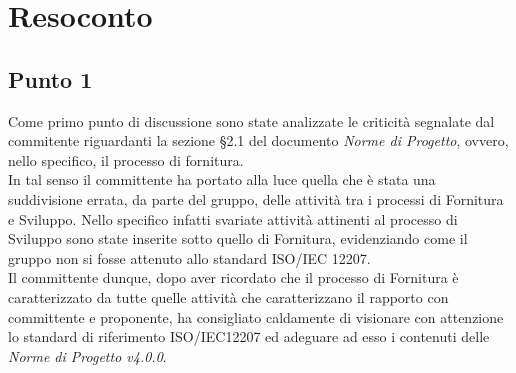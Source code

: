 \section{Resoconto}

\subsection{Punto 1}
Come primo punto di discussione sono state analizzate le criticità segnalate dal commitente riguardanti la sezione §2.1 del documento \textit{Norme di Progetto}, ovvero, nello specifico, il processo di fornitura.\\
In tal senso il committente ha portato alla luce quella che è stata una suddivisione errata, da parte del gruppo, delle attività tra i processi di Fornitura e Sviluppo. Nello specifico infatti svariate attività attinenti al processo di Sviluppo sono state inserite sotto quello di Fornitura, evidenziando come il gruppo non si fosse attenuto allo standard ISO/IEC 12207.\\
Il committente dunque, dopo aver ricordato che il processo di Fornitura è caratterizzato da tutte quelle attività che caratterizzano il rapporto con committente e proponente, ha consigliato caldamente di visionare con attenzione lo standard di riferimento ISO/IEC12207 ed adeguare ad esso i contenuti delle \textit{Norme di Progetto v4.0.0}.


